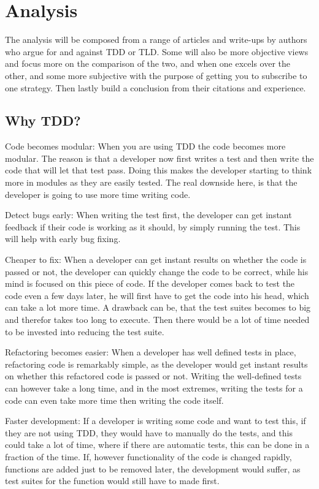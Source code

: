 \section{Analysis}
\label{section:analysis}
The analysis will be composed from a range of articles and write-ups by authors who argue for and against TDD or TLD. 
Some will also be more objective views and focus more on the comparison of the two, and when one excels over the other, 
and some more subjective with the purpose of getting you to subscribe to one strategy. 
Then lastly build a conclusion from their citations and experience.   



\subsection{Why TDD?}
Code becomes modular:
When you are using TDD the code becomes more modular. The reason is that a developer now first writes a test and then write the code that will let that test pass.  Doing this makes the developer starting to think more in modules as they are easily tested. The real downside here, is that the developer is going to use more time writing code.

Detect bugs early:
When writing the test first, the developer can get instant feedback if their code is working as it should, by simply running the test. This will help with early bug fixing.  

Cheaper to fix:
When a developer can get instant results on whether the code is passed or not, the developer can quickly change the code to be correct, while his mind is focused on this piece of code. If the developer comes back to test the code even a few days later, he will first have to get the code into his head, which can take a lot more time.
A drawback can be, that the test suites becomes to big and therefor takes too long to execute. Then there would be a lot of time needed to be invested into reducing the test suite.

Refactoring becomes easier:
When a developer has well defined tests in place, refactoring code is remarkably simple, as the developer would get instant results on whether this refactored code is passed or not. Writing the well-defined tests can however take a long time, and in the most extremes, writing the tests for a code can even take more time then writing the code itself.

Faster development:
If a developer is writing some code and want to test this, if they are not using TDD, they would have to manually do the tests, and this could take a lot of time, where if there are automatic tests, this can be done in a fraction of the time. If, however functionality of the code is changed rapidly, functions are added just to be removed later, the development would suffer, as test suites for the function would still have to made first.

